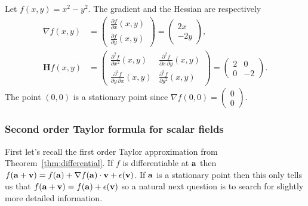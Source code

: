 \begin{example*}
    Let \(f(x,y)=x^2-y^2\).
    The gradient and the Hessian are respectively
    \[
        \begin{aligned}
            \nabla f(x,y)      & =\begin{pmatrix}
                                      \frac{\partial f}{\partial x} (x,y) \\[2.2ex]
                                      \frac{\partial f}{\partial y} (x,y)
                                  \end{pmatrix} =   \begin{pmatrix}
                                                        2x \\-2y
                                                    \end{pmatrix},         \\
            \mathbf{H} f (x,y) & = \begin{pmatrix}
                                       \frac{\partial^2 f}{\partial x^2} (x,y)
                                        & \frac{\partial^2 f}{\partial x\,\partial y} (x,y)
                                       \\[2.2ex]
                                       \frac{\partial^2 f}{\partial y\,\partial x} (x,y)
                                        & \frac{\partial^2 f}{\partial y^2}(x,y)
                                   \end{pmatrix}
            = \begin{pmatrix}
                  2
                   & 0
                  \\[2.2ex]
                  0
                   & -2
              \end{pmatrix}.
        \end{aligned}
    \]
    The point \((0,0)\) is a stationary point since \(\nabla f(0,0) =\left(\begin{smallmatrix}
            0\\0
        \end{smallmatrix}\right) \).
\end{example*}


\subsubsection*{Second order Taylor formula for scalar fields}

First let's recall the first order Taylor approximation from Theorem~\ref{thm:differential}.
If \(f\) is differentiable at \(\aa\)
then
\(  f(\aa+  \vv) = f(\aa)  + \nabla f(\aa) \cdot \vv + \epsilon(\vv)\).
If \(\aa\) is a stationary point then this only tells us that \(  f(\aa+  \vv) = f(\aa)  +  \epsilon(\vv)\) so a natural next question is to search for slightly more detailed information.


